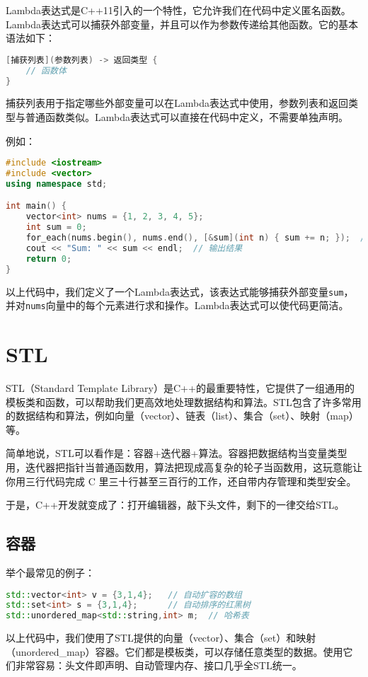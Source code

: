 \documentclass[../main.tex]{subfiles}
\begin{document}
Lambda表达式是C++11引入的一个特性，它允许我们在代码中定义匿名函数。Lambda表达式可以捕获外部变量，并且可以作为参数传递给其他函数。它的基本语法如下：
\begin{lstlisting}[language=C++]
[捕获列表](参数列表) -> 返回类型 {
    // 函数体
}
\end{lstlisting}
捕获列表用于指定哪些外部变量可以在Lambda表达式中使用，参数列表和返回类型与普通函数类似。Lambda表达式可以直接在代码中定义，不需要单独声明。

例如：
\begin{lstlisting}[language=C++]
#include <iostream>
#include <vector>
using namespace std;

int main() {
    vector<int> nums = {1, 2, 3, 4, 5};
    int sum = 0;
    for_each(nums.begin(), nums.end(), [&sum](int n) { sum += n; });  // 使用Lambda表达式计算总和
    cout << "Sum: " << sum << endl;  // 输出结果
    return 0;
}
\end{lstlisting}
以上代码中，我们定义了一个Lambda表达式，该表达式能够捕获外部变量\texttt{sum}，并对\texttt{nums}向量中的每个元素进行求和操作。Lambda表达式可以使代码更简洁。

\section{STL}

STL（Standard Template Library）是C++的最重要特性，它提供了一组通用的模板类和函数，可以帮助我们更高效地处理数据结构和算法。STL包含了许多常用的数据结构和算法，例如向量（vector）、链表（list）、集合（set）、映射（map）等。

简单地说，STL可以看作是：容器+迭代器+算法。容器把数据结构当变量类型用，迭代器把指针当普通函数用，算法把现成高复杂的轮子当函数用，这玩意能让你用三行代码完成 C 里三十行甚至三百行的工作，还自带内存管理和类型安全。

于是，C++开发就变成了：打开编辑器，敲下头文件，剩下的一律交给STL。

\subsection{容器}

举个最常见的例子：
\begin{lstlisting}[language=C++]
std::vector<int> v = {3,1,4};   // 自动扩容的数组
std::set<int> s = {3,1,4};      // 自动排序的红黑树
std::unordered_map<std::string,int> m;  // 哈希表
\end{lstlisting}
以上代码中，我们使用了STL提供的向量（vector）、集合（set）和映射（unordered\_map）容器。它们都是模板类，可以存储任意类型的数据。使用它们非常容易：头文件即声明、自动管理内存、接口几乎全STL统一。
\end{document}
